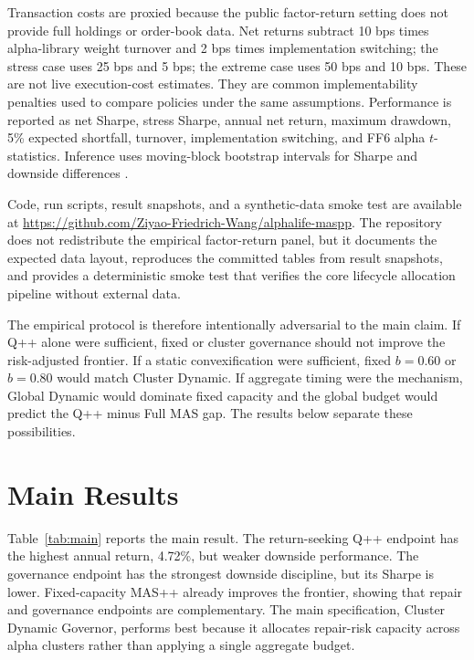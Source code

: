 \documentclass[sigconf,nonacm]{acmart}
\begin{document}
Transaction costs are proxied because the public factor-return setting does not provide full holdings or order-book data. Net returns subtract 10 bps times alpha-library weight turnover and 2 bps times implementation switching; the stress case uses 25 bps and 5 bps; the extreme case uses 50 bps and 10 bps. These are not live execution-cost estimates. They are common implementability penalties used to compare policies under the same assumptions. Performance is reported as net Sharpe, stress Sharpe, annual net return, maximum drawdown, 5\% expected shortfall, turnover, implementation switching, and FF6 alpha \(t\)-statistics. Inference uses moving-block bootstrap intervals for Sharpe and downside differences \cite{lo2002statistics,newey1987simple}.

Code, run scripts, result snapshots, and a synthetic-data smoke test are available at \url{https://github.com/Ziyao-Friedrich-Wang/alphalife-maspp}. The repository does not redistribute the empirical factor-return panel, but it documents the expected data layout, reproduces the committed tables from result snapshots, and provides a deterministic smoke test that verifies the core lifecycle allocation pipeline without external data.

The empirical protocol is therefore intentionally adversarial to the main claim. If Q++ alone were sufficient, fixed or cluster governance should not improve the risk-adjusted frontier. If a static convexification were sufficient, fixed \(b=0.60\) or \(b=0.80\) would match Cluster Dynamic. If aggregate timing were the mechanism, Global Dynamic would dominate fixed capacity and the global budget would predict the Q++ minus Full MAS gap. The results below separate these possibilities.

\section{Main Results}

Table~\ref{tab:main} reports the main result. The return-seeking Q++ endpoint has the highest annual return, 4.72\%, but weaker downside performance. The governance endpoint has the strongest downside discipline, but its Sharpe is lower. Fixed-capacity MAS++ already improves the frontier, showing that repair and governance endpoints are complementary. The main specification, Cluster Dynamic Governor, performs best because it allocates repair-risk capacity across alpha clusters rather than applying a single aggregate budget.
\end{document}
